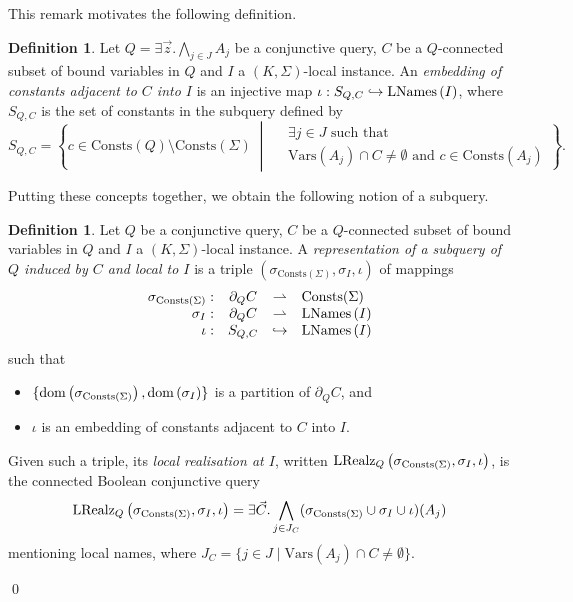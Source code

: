 \documentclass[12pt]{report}
\theoremstyle{plain}
\theoremstyle{definition}
\newtheorem{definition}[theorem]{Definition}
\def\Vars{{\mathrm{Vars}}}
\def\Consts{{\mathrm{Consts}}}
\newcommand{\dom}[1]{\ensuremath{\normalfont{\operatorname{dom}} \left( #1 \right)}}
\newcommand{\LNames}[1]{\ensuremath{\normalfont{\textrm{LNames}} \left( #1 \right)}}
\newcommand{\LRealz}[2]{\ensuremath{\normalfont{\textrm{LRealz}}_{ #1 } \left( #2 \right)}}
\begin{document}
This remark motivates the following definition.

\begin{definition}
  Let $Q = \exists \vec{z}. \bigwedge_{j \in J} A_j$ be a conjunctive query, $C$ be a $Q$-connected subset of bound variables in $Q$ and $I$ a $(K, \Sigma)$-local instance. An \emph{embedding of constants adjacent to $C$ into $I$} is an injective map $\iota: S_{Q, C} \hookrightarrow \LNames{I}$, where $S_{Q, C}$ is the set of constants in the subquery defined by $$
  S_{Q, C} = \left\{
      c \in \Consts(Q) \setminus \Consts(\Sigma)
        \;\middle|\;
      \begin{aligned}
        & \exists j \in J \text{ such that } \\
        & \Vars(A_j) \cap C \neq \emptyset \text{ and } c \in \Consts(A_j)
      \end{aligned}
    \right\}.
  $$
\end{definition}

Putting these concepts together, we obtain the following notion of a subquery.

\begin{definition}
  Let $Q$ be a conjunctive query, $C$ be a $Q$-connected subset of bound variables in $Q$ and $I$ a $(K, \Sigma)$-local instance. A \emph{representation of a subquery of $Q$ induced by $C$ and local to $I$} is a triple $(\sigma_{\Consts(\Sigma)}, \sigma_I, \iota)$ of mappings
  \[\begin{array}{rccl}
    \sigma_{\Consts(\Sigma)}: & \partial_Q C &\rightharpoonup& \Consts(\Sigma) \\
    \sigma_I: & \partial_Q C &\rightharpoonup& \LNames{I} \\
    \iota: & S_{Q,C} &\hookrightarrow& \LNames{I}
  \end{array}\]
  such that \begin{itemize}
    \item $\{ \dom{\sigma_{\Consts(\Sigma)}}, \dom{\sigma_I} \}$ is a partition of $\partial_Q C$, and
    \item $\iota$ is an embedding of constants adjacent to $C$ into $I$.
  \end{itemize}

  Given such a triple, its \emph{local realisation at $I$}, written $\LRealz{Q}{\sigma_{\Consts(\Sigma)}, \sigma_I, \iota}$, is the connected Boolean conjunctive query $$
  \LRealz{Q}{\sigma_{\Consts(\Sigma)}, \sigma_I, \iota} = \exists \vec{C}. \bigwedge_{j \in J_C} (\sigma_{\Consts(\Sigma)} \cup \sigma_I \cup \iota)(A_j)
  $$
  mentioning local names, where $J_C = \{ j \in J \mid \Vars(A_j) \cap C \neq \emptyset \}$.

  \qed
\end{definition}
\end{document}

